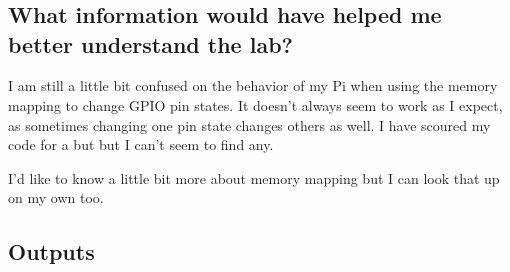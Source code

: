 \documentclass{article}
\begin{document}
\section{}
\subsection{What information would have helped me better understand the lab?}
I am still a little bit confused on the behavior of my Pi when using the memory mapping to change GPIO pin states. It doesn't always seem to work as I expect, as sometimes changing one pin state changes others as well. I have scoured my code for a but but I can't seem to find any. 

I'd like to know a little bit more about memory mapping but I can look that up on my own too.
\subsection{Outputs}

%
\end{document}
